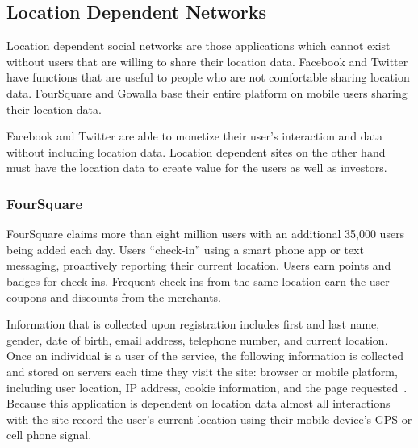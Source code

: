 \subsection{Location Dependent Networks} 
Location dependent social networks are those applications which cannot exist
without users that are willing to share their location data. Facebook and
Twitter have functions that are useful to people who are not comfortable
sharing location data. FourSquare and Gowalla base their entire platform
on mobile users sharing their location data.

Facebook and Twitter are able to monetize their user's interaction and data
without including location data. Location dependent sites on the other hand must
have the location data to create value for the users as well as investors.%


\subsubsection{FourSquare} 
FourSquare claims more than eight million users with an additional 35,000 users
being added each day.  Users “check-in” using a smart phone app or text
messaging, proactively reporting their current location.  Users earn points and
badges for check-ins. Frequent check-ins from the same location earn the user
coupons and discounts from the merchants.  

Information that is collected upon registration includes first and last name,
gender, date of birth, email address, telephone number, and current location.
Once an individual is a user of the service, the following information is
collected and stored on servers each time they visit the site: browser or mobile
platform, including user location, IP address, cookie information, and the page
requested~\cite{fspp}. Because this application is dependent on location data
almost all interactions with the site record the user's current location using
their mobile device's GPS or cell phone signal.

